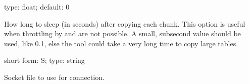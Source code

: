 \documentclass[letterpaper,10pt,english]{sphinxmanual}
\begin{document}
\begin{fulllineitems}
\label{\detokenize{mariadb-schema-change:cmdoption-mariadb-schema-change-sleep}}
\sphinxAtStartPar
type: float; default: 0

\sphinxAtStartPar
How long to sleep (in seconds) after copying each chunk. This option is useful
when throttling by {\hyperref[\detokenize{mariadb-schema-change:cmdoption-mariadb-schema-change-max-lag}]{}} and {\hyperref[\detokenize{mariadb-schema-change:cmdoption-mariadb-schema-change-max-load}]{}} are not possible.
A small, sub\sphinxhyphen{}second value should be used, like 0.1, else the tool could take
a very long time to copy large tables.

\end{fulllineitems}


\begin{fulllineitems}
\label{\detokenize{mariadb-schema-change:cmdoption-mariadb-schema-change-socket}}
\sphinxAtStartPar
short form: \sphinxhyphen{}S; type: string

\sphinxAtStartPar
Socket file to use for connection.

\end{fulllineitems}

\end{document}
